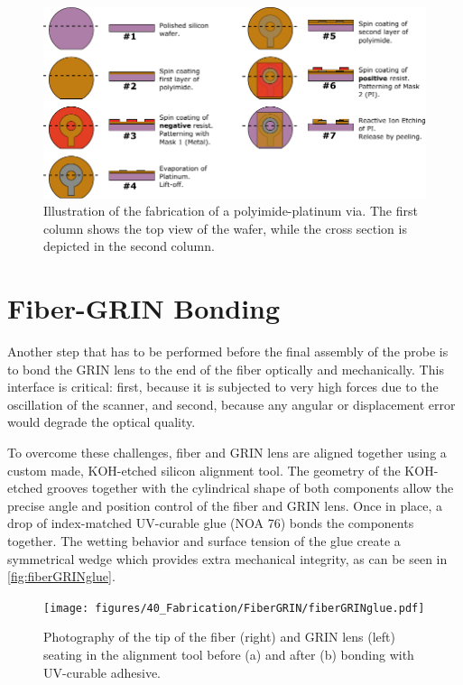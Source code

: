 \begin{figure}[h!]\centering \includegraphics[width=15cm]{figures/40_Fabrication/PI/processH.pdf}
      \caption{Illustration of the fabrication of a polyimide-platinum via. The first column shows the top view of the wafer, while the cross section is depicted in the second column.}
      \label{fig:piProcess}
\end{figure}

\clearpage
\section{Fiber-GRIN Bonding}
\label{sec:fiberGRIN}
Another step that has to be performed before the final assembly of the probe is to bond the GRIN lens to the end of the fiber optically and mechanically. This interface is critical: first, because it is subjected to very high forces due to the oscillation of the scanner, and second, because any angular or displacement error would degrade the optical quality.

To overcome these challenges, fiber and GRIN lens are aligned together using a custom made, KOH-etched silicon alignment tool. The geometry of the KOH-etched grooves together with the cylindrical shape of both components allow the precise angle and position control of the fiber and GRIN lens. Once in place, a drop of index-matched UV-curable glue (NOA 76) bonds the components together. The wetting behavior and surface tension of the glue create a symmetrical wedge which provides extra mechanical integrity, as can be seen in \autoref{fig:fiberGRINglue}.

\begin{figure}[h!]\centering \texttt{[image: figures/40\_Fabrication/FiberGRIN/fiberGRINglue.pdf]}
      \caption{Photography of the tip of the fiber (right) and GRIN lens (left) seating in the alignment tool before (a) and after (b) bonding with UV-curable adhesive.}
      \label{fig:fiberGRINglue}
\end{figure}

